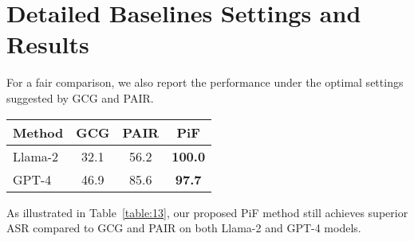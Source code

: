 \section{Detailed Baselines Settings and Results}
\label{appendix:E}

For a fair comparison, we also report the performance under the optimal settings suggested by GCG and PAIR.

\begin{table*}[h]
\setlength{\tabcolsep}{15pt}
\caption{{Compare the ASR ($\uparrow$) of various attack methods on AdvBench.}}
\label{table:13}
\centering
  \begin{tabular}{l | c  c  c}
    \toprule
    \toprule
    {Method} & {GCG} & {PAIR} &  {PiF} \\
    \midrule
     {Llama-2} & {32.1} & {56.2} & \cellcolor{SelfColor!15}\textbf{{100.0}} \\ 
    \midrule     
     {GPT-4} & {46.9} &  {85.6} & \cellcolor{SelfColor!15}\textbf{{97.7}} \\
    \bottomrule
    \bottomrule
  \end{tabular}
\end{table*}

As illustrated in Table~\ref{table:13}, our proposed PiF method still achieves superior ASR compared to GCG and PAIR on both Llama-2 and GPT-4 models.